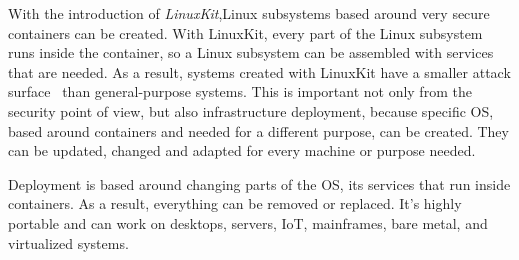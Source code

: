 \noindent
With the introduction of \textit{LinuxKit},Linux subsystems based around very secure containers can be created. With LinuxKit, every part of the Linux subsystem runs inside the container, so a Linux subsystem can be assembled with services that are needed. As a result, systems created with LinuxKit have a smaller attack surface~\cite{abs-1802-10375} than general-purpose systems. This is important not only from the security point of view, but also infrastructure deployment, because specific OS, based around containers and needed for a different purpose, can be created. They can be updated, changed and adapted for every machine or purpose needed.

Deployment is based around changing parts of the OS, its services that run inside containers. As a result, everything can be removed or replaced. It's highly portable and can work on desktops, servers, IoT, mainframes, bare metal, and virtualized systems.
%
%
